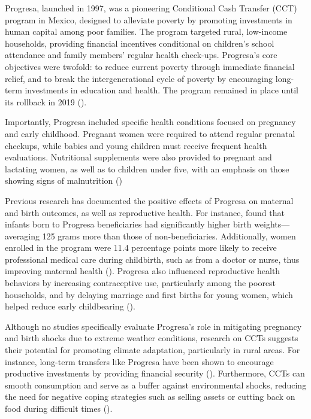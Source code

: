 \documentclass[12pt, oneside]{article}      %
\begin{document}
Progresa, launched in 1997, was a pioneering Conditional Cash Transfer (CCT) program in Mexico, designed to alleviate poverty by promoting investments in human capital among poor families. The program targeted rural, low-income households, providing financial incentives conditional on children's school attendance and family members’ regular health check-ups. Progresa's core objectives were twofold: to reduce current poverty through immediate financial relief, and to break the intergenerational cycle of poverty by encouraging long-term investments in education and health. The program remained in place until its rollback in 2019 (\cite{Parker2023}).

Importantly, Progresa included specific health conditions focused on pregnancy and early childhood. Pregnant women were required to attend regular prenatal checkups, while babies and young children must receive frequent health evaluations. Nutritional supplements were also provided to pregnant and lactating women, as well as to children under five, with an emphasis on those showing signs of malnutrition (\cite{Parker2017})

Previous research has documented the positive effects of Progresa on maternal and birth outcomes, as well as reproductive health. For instance, \cite{Barber2008} found that infants born to Progresa beneficiaries had significantly higher birth weights—averaging 125 grams more than those of non-beneficiaries. Additionally, women enrolled in the program were 11.4 percentage points more likely to receive professional medical care during childbirth, such as from a doctor or nurse, thus improving maternal health (\cite{Urquieta2009}). Progresa also influenced reproductive health behaviors by increasing contraceptive use, particularly among the poorest households, and by delaying marriage and first births for young women, which helped reduce early childbearing (\cite{LamadridFigueroa2010}).

Although no studies specifically evaluate Progresa's role in mitigating pregnancy and birth shocks due to extreme weather conditions, research on CCTs suggests their potential for promoting climate adaptation, particularly in rural areas. For instance, long-term transfers like Progresa have been shown to encourage productive investments by providing financial security (\cite{Gertler2012}). Furthermore, CCTs can smooth consumption and serve as a buffer against environmental shocks, reducing the need for negative coping strategies such as selling assets or cutting back on food during difficult times (\cite{macours2012transfers}).
\end{document}

